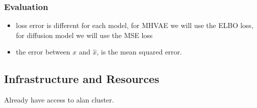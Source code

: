 \documentclass[twocolumn,superscriptaddress,aps]{revtex4-1}
\begin{document}
\subsubsection{Evaluation}
\begin{itemize}
    \item loss error is different for each model, for MHVAE we will use the ELBO loss, for diffusion model we will use the MSE loss
    \item the error between $x$ and $\hat{x}$, is the mean squared error.
\end{itemize}

\subsection{Infrastructure and Resources}
Already have access to alan cluster.



% 
% 
\end{document}
